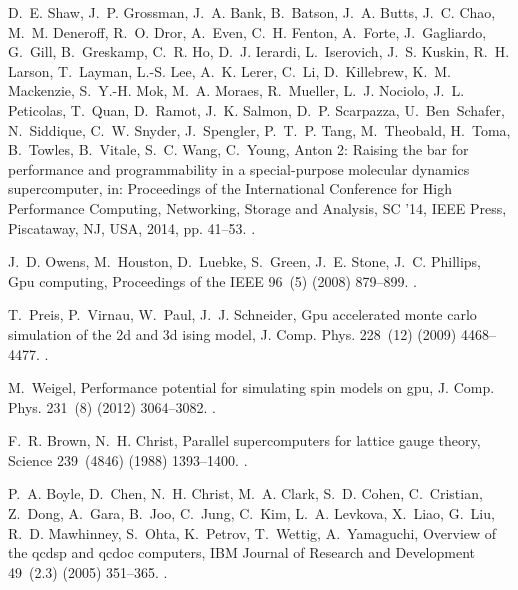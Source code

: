 \documentclass[preprint]{elsarticle}
\begin{document}
\begin{thebibliography}{10}
D.~E. Shaw, J.~P. Grossman, J.~A. Bank, B.~Batson, J.~A. Butts, J.~C. Chao,
  M.~M. Deneroff, R.~O. Dror, A.~Even, C.~H. Fenton, A.~Forte, J.~Gagliardo,
  G.~Gill, B.~Greskamp, C.~R. Ho, D.~J. Ierardi, L.~Iserovich, J.~S. Kuskin,
  R.~H. Larson, T.~Layman, L.-S. Lee, A.~K. Lerer, C.~Li, D.~Killebrew, K.~M.
  Mackenzie, S.~Y.-H. Mok, M.~A. Moraes, R.~Mueller, L.~J. Nociolo, J.~L.
  Peticolas, T.~Quan, D.~Ramot, J.~K. Salmon, D.~P. Scarpazza, U.~Ben~Schafer,
  N.~Siddique, C.~W. Snyder, J.~Spengler, P.~T.~P. Tang, M.~Theobald, H.~Toma,
  B.~Towles, B.~Vitale, S.~C. Wang, C.~Young, Anton 2: Raising the bar for
  performance and programmability in a special-purpose molecular dynamics
  supercomputer, in: Proceedings of the International Conference for High
  Performance Computing, Networking, Storage and Analysis, SC '14, IEEE Press,
  Piscataway, NJ, USA, 2014, pp. 41--53.
\newblock \href {https://doi.org/10.1109/SC.2014.9}
  {}.

J.~D. {Owens}, M.~{Houston}, D.~{Luebke}, S.~{Green}, J.~E. {Stone}, J.~C.
  {Phillips}, Gpu computing, Proceedings of the IEEE 96~(5) (2008) 879--899.
\newblock \href {https://doi.org/10.1109/JPROC.2008.917757}
  {}.

T.~Preis, P.~Virnau, W.~Paul, J.~J. Schneider, Gpu accelerated monte carlo
  simulation of the 2d and 3d ising model, J. Comp. Phys. 228~(12) (2009)
  4468--4477.
\newblock \href {https://doi.org/10.1016/j.jcp.2009.03.018}
  {}.

M.~Weigel, Performance potential for simulating spin models on gpu, J. Comp.
  Phys. 231~(8) (2012) 3064--3082.
\newblock \href {https://doi.org/10.1016/j.jcp.2011.12.008}
  {}.

F.~R. Brown, N.~H. Christ, Parallel supercomputers for lattice gauge theory,
  Science 239~(4846) (1988) 1393--1400.
\newblock \href {https://doi.org/10.1126/science.239.4846.1393}
  {}.

P.~A. {Boyle}, D.~{Chen}, N.~H. {Christ}, M.~A. {Clark}, S.~D. {Cohen},
  C.~{Cristian}, Z.~{Dong}, A.~{Gara}, B.~{Joo}, C.~{Jung}, C.~{Kim}, L.~A.
  {Levkova}, X.~{Liao}, G.~{Liu}, R.~D. {Mawhinney}, S.~{Ohta}, K.~{Petrov},
  T.~{Wettig}, A.~{Yamaguchi}, Overview of the qcdsp and qcdoc computers, IBM
  Journal of Research and Development 49~(2.3) (2005) 351--365.
\newblock \href {https://doi.org/10.1147/rd.492.0351}
  {}.


\end{thebibliography}
\end{document}
